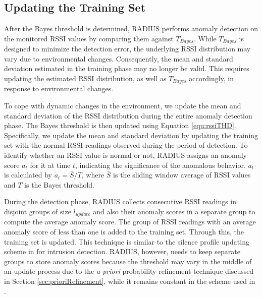 \subsection{Updating the Training Set} \label{sec:trainingSetUpdate}

After the Bayes threshold is determined, RADIUS performs anomaly detection on the monitored RSSI values by comparing them against $T_{Bayes}$. While $T_{Bayes}$ is designed to minimize the detection error, the underlying RSSI distribution may vary due to environmental changes. Consequently, the mean and standard deviation estimated in the training phase may no longer be valid. This requires updating the estimated RSSI distribution, as well as $T_{Bayes}$ accordingly, in response to environmental changes.%

To cope with dynamic changes in the environment, we update the mean and standard deviation of the RSSI distribution during the entire anomaly detection phase. The Bayes threshold is then updated using Equation \ref{equ:rssiTHD}. %
Specifically, we update the mean and standard deviation by updating the training set with the normal RSSI readings observed during the period of detection. To identify whether an RSSI value is normal or not, RADIUS assigns an anomaly score $a_{t}$ for it at time $t$, indicating the significance of the anomalous behavior. $a_{t}$ is calculated by $a_{t} = \bar{S}/T$, where $\bar{S}$ is the sliding window average of RSSI values and $T$ is the Bayes threshold. 

During the detection phase, RADIUS collects consecutive RSSI readings in disjoint groups of size $l_{update}$ and also their anomaly scores in a separate group to compute the average anomaly score. The group of RSSI readings with an average anomaly score of less than one is added to the training set. Through this, the training set is updated. This technique is similar to the silence profile updating scheme in \cite{6199865} for intrusion detection. RADIUS, however, needs to keep separate groups to store anomaly scores because the threshold may vary in the middle of an update process due to the \textit{a priori} probability refinement technique discussed in Section \ref{sec:prioriRefinement}, while it remains constant in the scheme used in \cite{6199865}. 


